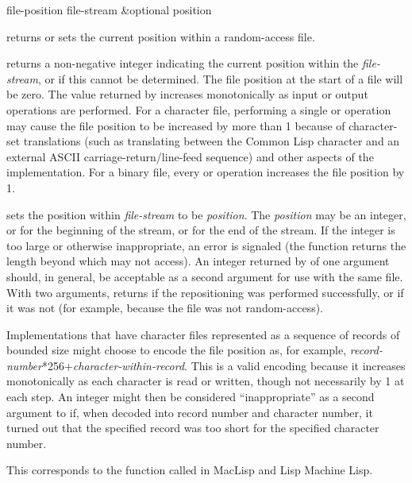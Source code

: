 \begin{defun}[Function]
file-position file-stream &optional position

 returns or sets the current position within
a random-access file.

 returns a non-negative integer
indicating the current position within the {\it file-stream}, or {\false} if
this cannot be determined.  The file position at the start of a file will
be zero.  The value returned by  increases monotonically
as input or output operations are performed.  For a character file,
performing a single  or  operation
may cause the file position to be increased by more than 1 because of
character-set translations (such as translating between the Common Lisp
 character and an external {ASCII}
carriage-return/line-feed sequence) and other aspects of the
implementation.  For a binary file, every  or 
operation increases the file position by 1.

 sets the position within
{\it file-stream} to be {\it position}.  The {\it position} may be an integer,
or  for the beginning of the stream, or  for the end of the
stream.
If the integer is too large or otherwise inappropriate, an error
is signaled (the  function returns the length beyond
which  may not access).  An integer returned by
 of one argument should, in general, be acceptable
as a second argument for use with the same file.
With two arguments,
 returns {\true} if the repositioning was performed
successfully, or {\false} if it was not (for example,
because the file was not random-access).

\beforenoterule
\begin{implementation}
Implementations that have character files represented
as a sequence of records of bounded size might choose to encode the
file position as, for example,
{\it record-number}*256+{\it character-within-record}.
This is a valid encoding because it increases monotonically as
each character is read or written, though not necessarily by 1 at
each step.  An integer might then be considered ``inappropriate''
as a second argument to  if, when decoded into
record number and character number, it turned out that the
specified record was too short for the specified character number.
\end{implementation}
\betweennoterule
\begin{incompatibility}
This corresponds to the function
called  in MacLisp and Lisp Machine Lisp.
\end{incompatibility}
\afternoterule
\end{defun}

